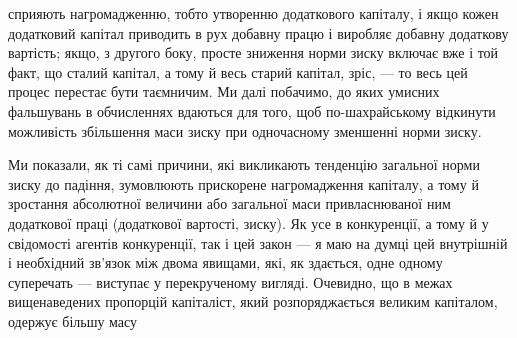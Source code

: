 сприяють нагромадженню, тобто утворенню додаткового капіталу,
і якщо кожен додатковий капітал приводить в рух добавну
працю і виробляє добавну додаткову вартість; якщо, з другого
боку, просте зниження норми зиску включає вже і той
факт, що сталий капітал, а тому й весь старий капітал, зріс, —
то весь цей процес перестає бути таємничим. Ми далі побачимо,
до яких умисних фальшувань в обчисленнях вдаються
для того, щоб по-шахрайському відкинути можливість збільшення
маси зиску при одночасному зменшенні норми зиску.

Ми показали, як ті самі причини, які викликають тенденцію
загальної норми зиску до падіння, зумовлюють прискорене нагромадження
капіталу, а тому й зростання абсолютної величини або
загальної маси привласнюваної ним додаткової праці (додаткової
вартості, зиску). Як усе в конкуренції, а тому й у свідомості
агентів конкуренції, так і цей закон — я маю на думці цей внутрішній
і необхідний зв’язок між двома явищами, які, як здається,
одне одному суперечать — виступає у перекрученому вигляді.
Очевидно, що в межах вищенаведених пропорцій капіталіст,
який розпоряджається великим капіталом, одержує більшу масу

